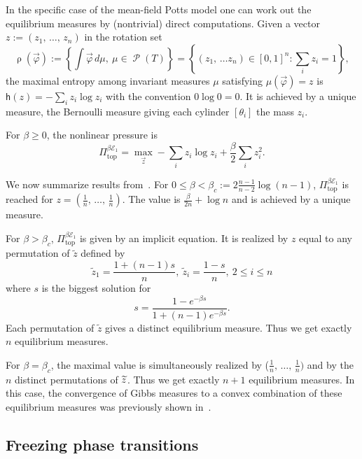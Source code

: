 \documentclass[10pt]{amsart}
\theoremstyle{definition}\newtheorem{defi}[theo]{Definition}\newtheorem{rema}[theo]{Remark}\newtheorem{exam}[theo]{Example}\newtheorem{exem}[theo]{Example}\newtheorem{nota}[theo]{Notation}
\theoremstyle{plain}
\theoremstyle{plain}
\newcommand\NLP{\Pi}
\renewcommand\top{{\mathrm{top}}}
\newcommand\Prob{{\operatorname{\mathscr{P}}}}
\newcommand{\rs}{\operatorname{\rho}}
\newcommand{\hf}{\mathsf{h}}
\newcommand{\pot}{\varphi}
\newcounter{In}
\newcommand*\be{\beta}
\newcommand*\8{\infty}
\newcommand{\En}{\mathcal{E}}
\let\oldtilde\tilde
\renewcommand*{\tilde}[1]{\mathchoice{\widetilde{#1}}{\widetilde{#1}}{\oldtilde{#1}}{\oldtilde{#1}}}
\begin{document}
In the specific case of the mean-field Potts model one can work out the equilibrium measures by (nontrivial) direct computations. Given a vector $z:=(z_{1},\,\ldots,\,z_{n})$ in the rotation set
\[
\rs(\vec\pot) :=\left\{\int\vec\pot\,d\mu,\ \mu\in\Prob(T)\right\} = \left\{(z_1,\,\dots z_n) \in [0,1]^n \colon \sum_i z_i = 1\right\},
\]
the maximal entropy among invariant measures $\mu$ satisfying $\mu(\vec\pot)=z$ is $\hf(z)=-\sum_{i}z_{i}\log z_{i}$ with the convention $0\log 0=0$. It is achieved by a unique measure, the Bernoulli measure giving each cylinder $[\theta_i]$ the mass $z_i$.

For $\be\ge 0$, the nonlinear pressure is
\[
\NLP_\top^{\beta\En_1}=\max_{\vec z}-\sum_{i}z_{i}\log z_{i}+\frac{\be}{2}\sum_{i}z_{i}^{2}.
\]


We now summarize results from~\cite{EllisWang90}. For $0 \le \be<\be_{c}:= 2\frac{n-1}{n-2}\log(n-1)$, $\NLP_{\top}^{\beta\En_1}$ is reached for $z=(\frac1n,\,\dots,\,\frac1n)$. The value is $\frac\be{2n}+\log n$ and is achieved by a unique measure.

For $\be>\be_{c}$, $\NLP_{\top}^{ \beta\En_1}$ is given by an implicit equation. It is realized by $z$ equal to any permutation of $\widetilde{z}$ defined by
\[
\widetilde{z}_{1}=\frac{1+(n-1)s}n,\ \widetilde{z}_{i}=\frac{1-s}n,\ 2\le i\le n
\]
where $s$ is the biggest solution for
\[
s=\frac{1-e^{-\be s}}{1+(n-1)e^{-\be s}}.
\]
Each permutation of $\widetilde{z}$ gives a distinct equilibrium measure. Thus we get exactly $n$ equilibrium measures.

For $\be=\be_{c}$, the maximal value is simultaneously realized by ($\frac1n,\,\ldots,\,\frac1n)$ and by the $n$ distinct permutations of $\tilde z$. Thus we get exactly $n+1$ equilibrium measures. In this case, the convergence of Gibbs measures to a convex combination of these equilibrium measures was previously shown in~\cite{Leplaideur-Watbled-2}.



\subsection{Freezing phase transitions}\label{sec:transition}
\end{document}
